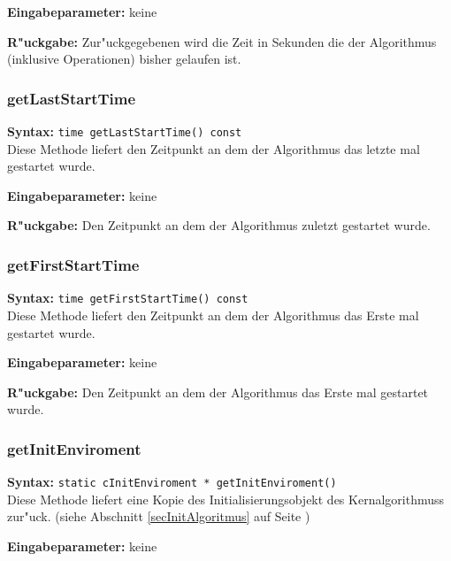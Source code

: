 \bigskip\noindent
\textbf{Eingabeparameter:} keine

\bigskip\noindent
\textbf{R"uckgabe:} Zur"uckgegebenen wird die Zeit in Sekunden die der Algorithmus (inklusive Operationen) bisher gelaufen ist.


\subsubsection{getLastStartTime}

\textbf{Syntax:} \verb|time getLastStartTime() const| \\

Diese Methode liefert den Zeitpunkt an dem der Algorithmus das letzte mal gestartet wurde.

\bigskip\noindent
\textbf{Eingabeparameter:} keine

\bigskip\noindent
\textbf{R"uckgabe:} Den Zeitpunkt an dem der Algorithmus zuletzt gestartet wurde.


\subsubsection{getFirstStartTime}

\textbf{Syntax:} \verb|time getFirstStartTime() const| \\

Diese Methode liefert den Zeitpunkt an dem der Algorithmus das Erste mal gestartet wurde.

\bigskip\noindent
\textbf{Eingabeparameter:} keine

\bigskip\noindent
\textbf{R"uckgabe:} Den Zeitpunkt an dem der Algorithmus das Erste mal gestartet wurde.


\subsubsection{getInitEnviroment}

\textbf{Syntax:} \verb|static cInitEnviroment * getInitEnviroment()| \\

Diese Methode liefert eine Kopie des Initialisierungsobjekt des Kernalgorithmuss zur"uck. (siehe Abschnitt \ref{secInitAlgoritmus} auf Seite \pageref{secInitAlgoritmus})

\bigskip\noindent
\textbf{Eingabeparameter:} keine

